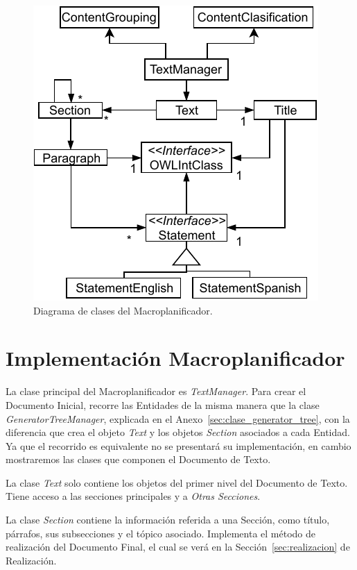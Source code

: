 \begin{figure}
    \centering
    \includegraphics{img/generacion_documento/diagrama_clases_macroplanificador.pdf}
    \caption{Diagrama de clases del Macroplanificador.}
    \label{fig:diagrama_clases_macroplanificador}
\end{figure}

\section{Implementación Macroplanificador}
La clase principal del Macroplanificador es \emph{TextManager}. Para crear el Documento Inicial, recorre las Entidades de la misma manera que la clase \emph{GeneratorTreeManager}, explicada en el Anexo~\ref{sec:clase_generator_tree}, con la diferencia que crea el objeto \emph{Text} y los objetos \emph{Section} asociados a cada Entidad. Ya que el recorrido es equivalente no se presentará su implementación, en cambio mostraremos las clases que componen el Documento de Texto.

La clase \emph{Text} solo contiene los objetos del primer nivel del Documento de Texto. Tiene acceso a las secciones principales y a \emph{Otras Secciones}. 

La clase \emph{Section} contiene la información referida a una Sección, como título, párrafos, sus subsecciones y el tópico asociado. Implementa el método de realización del Documento Final, el cual se verá en la Sección~\ref{sec:realizacion} de Realización.

